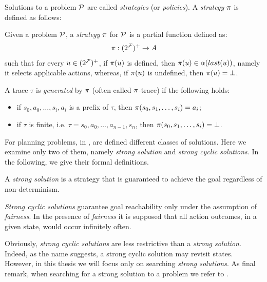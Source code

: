 Solutions to a \FOND problem $\P$ are called \textit{strategies} (or \textit{policies}). A \textit{strategy} $\trace$ is defined as follows:
\begin{definition}\label{def:policy}
Given a \FOND problem $\P$, a \textit{strategy} $\trace$ for $\P$ is a partial function defined as:
\begin{equation}
\trace: (2^\F)^+ \rightarrow A
\end{equation}
such that for every $u \in (2^\F)^+$, if $\trace(u)$ is defined, then $\trace(u) \in \alpha(last(u))$, namely it selects applicable actions, whereas, if $\trace(u)$ is undefined, then $\trace(u) = \bot$.
\end{definition}
\noindent A trace $\tau$ is \textit{generated} by $\trace$ (often called $\trace$-trace) if the following holds:
\begin{itemize}
\item if $s_0,a_0,\dots,s_i,a_i$ is a prefix of $\tau$, then $\trace(s_0,s_1,\dots,s_i) = a_i$;
\item if $\tau$ is finite, i.e. $\tau = s_0,a_0,\dots,a_{n-1},s_n$, then $\trace(s_0,s_1,\dots,s_i) = \bot$.
\end{itemize}

For \FOND planning problems, in \citep{cimatti2003weak}, are defined different classes of solutions. Here we examine only two of them, namely \textit{strong solution} and \textit{strong cyclic solutions}. In the following, we give their formal definitions.

\begin{definition}\label{def:strong-sol}
A \textit{strong solution} is a strategy that is guaranteed to achieve the goal regardless of non-determinism.
\end{definition}

\begin{definition}\label{def:strong-cyc-sol}
\textit{Strong cyclic solutions} guarantee goal reachability only under the assumption of \textit{fairness}. In the presence of \textit{fairness} it is supposed that all action outcomes, in a given state, would occur infinitely often. 
\end{definition}
Obviously, \textit{strong cyclic solutions} are less restrictive than a \textit{strong solution}.
Indeed, as the name suggests, a strong cyclic solution may revisit states. However, in this thesis we will focus only on searching \textit{strong solutions}. As final remark, when searching for a strong solution to a \FOND problem we refer to \FONDS.

